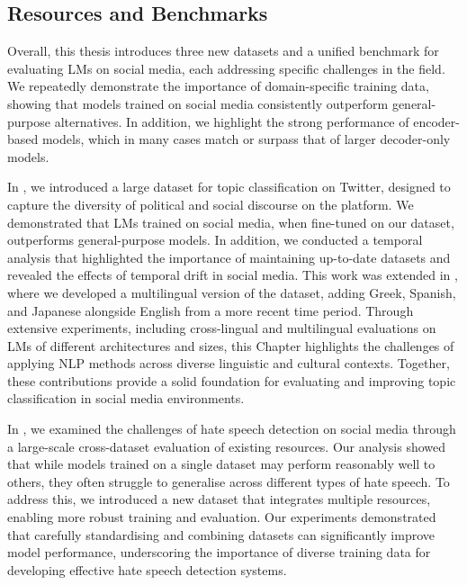 \subsection{Resources and Benchmarks}
Overall, this thesis introduces three new datasets and a unified benchmark for evaluating \acp{LM} on social media, each addressing specific challenges in the field. We repeatedly demonstrate the importance of domain-specific training data, showing that models trained on social media consistently outperform general-purpose alternatives. In addition, we highlight the strong performance of encoder-based models, which in many cases match or surpass that of larger decoder-only models.

In , we introduced a large dataset for topic classification on Twitter, designed to capture the diversity of political and social discourse on the platform. We demonstrated that \acp{LM} trained on social media, when fine-tuned on our dataset, outperforms general-purpose models. In addition, we conducted a temporal analysis that highlighted the importance of maintaining up-to-date datasets and revealed the effects of temporal drift in social media. This work was extended in , where we developed a multilingual version of the dataset, adding Greek, Spanish, and Japanese alongside English from a more recent time period. Through extensive experiments, including cross-lingual and multilingual evaluations on \acp{LM} of different architectures and sizes, this Chapter highlights the challenges of applying \ac{NLP} methods across diverse linguistic and cultural contexts. Together, these contributions provide a solid foundation for evaluating and improving topic classification in social media environments.


In , we examined the challenges of hate speech detection on social media through a large-scale cross-dataset evaluation of existing resources. Our analysis showed that while models trained on a single dataset may perform reasonably well to others, they often struggle to generalise across different types of hate speech. To address this, we introduced a new dataset that integrates multiple resources, enabling more robust training and evaluation. Our experiments demonstrated that carefully standardising and combining datasets can significantly improve model performance, underscoring the importance of diverse training data for developing effective hate speech detection systems.


